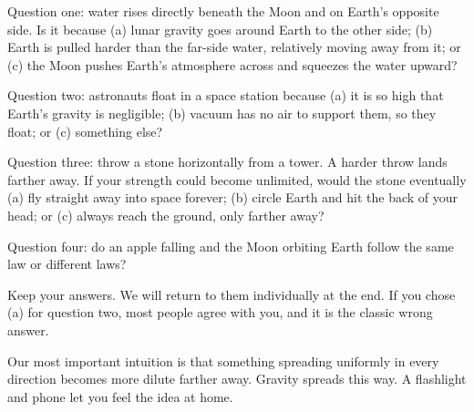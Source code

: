 Question one: water rises directly beneath the Moon and on Earth's opposite side. Is it because (a) lunar gravity goes around Earth to the other side; (b) Earth is pulled harder than the far-side water, relatively moving away from it; or (c) the Moon pushes Earth's atmosphere across and squeezes the water upward?

Question two: astronauts float in a space station because (a) it is so high that Earth's gravity is negligible; (b) vacuum has no air to support them, so they float; or (c) something else?

Question three: throw a stone horizontally from a tower. A harder throw lands farther away. If your strength could become unlimited, would the stone eventually (a) fly straight away into space forever; (b) circle Earth and hit the back of your head; or (c) always reach the ground, only farther away?

Question four: do an apple falling and the Moon orbiting Earth follow the same law or different laws?

Keep your answers. We will return to them individually at the end. If you chose (a) for question two, most people agree with you, and it is the classic wrong answer.


Our most important intuition is that something spreading uniformly in every direction becomes more dilute farther away. Gravity spreads this way. A flashlight and phone let you feel the idea at home.

